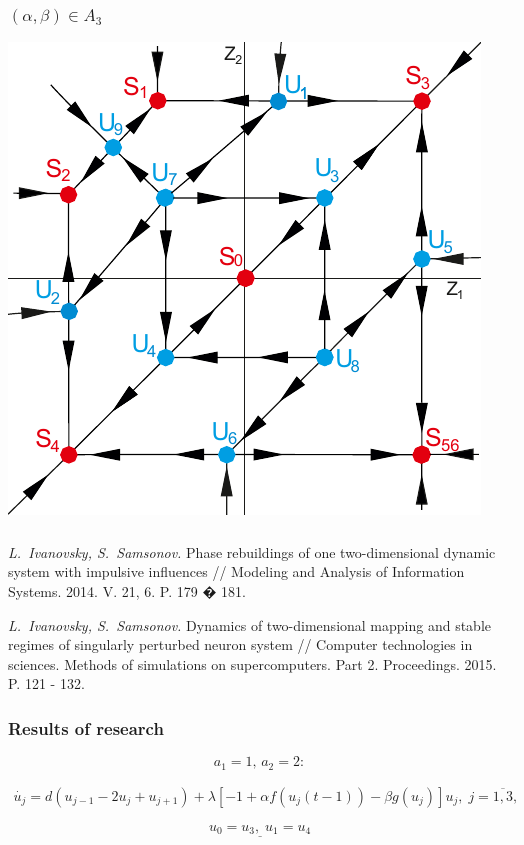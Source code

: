 \documentclass[fullscreen=true, unicode, bookmarks=false]{beamer}
\begin{document}
\begin{frame}
\frametitle{$ (\alpha, \beta) \in A_3 $} 
\begin{center}
  \includegraphics[scale=0.85]{neuIII2.pdf}  
 \end{center}
\end{frame}

\begin{frame}
\frametitle{} 

\textit{L.~Ivanovsky, S.~Samsonov. } 
{Phase rebuildings of one two-dimensional dynamic system with impulsive influences //
Modeling and Analysis of Information Systems. 2014. V. 21,  6. P. 179 � 181. }

\vspace{2cm}

\textit{L.~Ivanovsky, S.~Samsonov. } 
{Dynamics of two-dimensional mapping and stable regimes of singularly perturbed neuron system //
Computer technologies in sciences. Methods of simulations on supercomputers. Part 2. Proceedings. 2015. P. 121 - 132. }


\end{frame}

\begin{frame}
\frametitle{Results of research} 

$$ a_1 = 1, \, a_2 = 2: $$

\begin{eqnarray}
	\dot{u_j} = d(u_{j-1}-2u_j+u_{j+1})+\lambda[-1+\alpha f(u_j(t-1)) - \beta g(u_j)]u_j, \; j=\overline{1,3}, \nonumber
\end{eqnarray}		

$$ \underline{u_0=u_3, \; u_1=u_4} $$

\end{frame}
\end{document}
